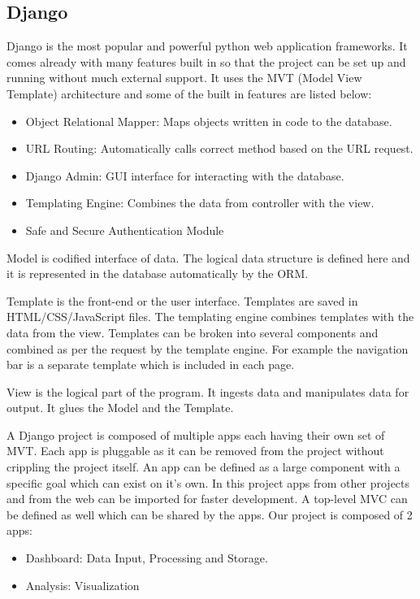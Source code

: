 \subsection{Django}
Django is the most popular and powerful python web application frameworks. It comes already with many
features built in so that the project can be set up and running without much external support. 
It uses the MVT (Model View Template) architecture and some of the built in features are listed below:

\begin{itemize}
    \item Object Relational Mapper: Maps objects written in code to the database.
    \item URL Routing: Automatically calls correct method based on the URL request.
    \item Django Admin: GUI interface for interacting with the database.
    \item Templating Engine: Combines the data from controller with the view.
    \item Safe and Secure Authentication Module
\end{itemize}

\begin{definition}
	Model is codified interface of data. The logical data structure is defined here and it is represented in the database
	automatically by the ORM.
\end{definition}

\begin{definition}
	Template is the front-end or the user interface. Templates are saved in HTML/CSS/JavaScript files. The templating engine combines
	templates with the data from the view. Templates can be broken into several components and combined as per the request by the template engine.
	For example the navigation bar is a separate template which is included in each page.
\end{definition}

\begin{definition}
	View is the logical part of the program. It ingests data and manipulates data for output. It glues the Model and the Template.
\end{definition}

A Django project is composed of multiple apps each having their own set of MVT. Each app is pluggable as it can be removed from the project
without crippling the project itself. An app can be defined as a large component with a specific goal which can exist on it's own.
In this project apps from other projects and from the web can be imported for faster development. A top-level MVC can be defined as well which can be
shared by the apps. Our project is composed of 2 apps:
\begin{itemize}
    \item Dashboard: Data Input, Processing and Storage.
    \item Analysis: Visualization
\end{itemize}

